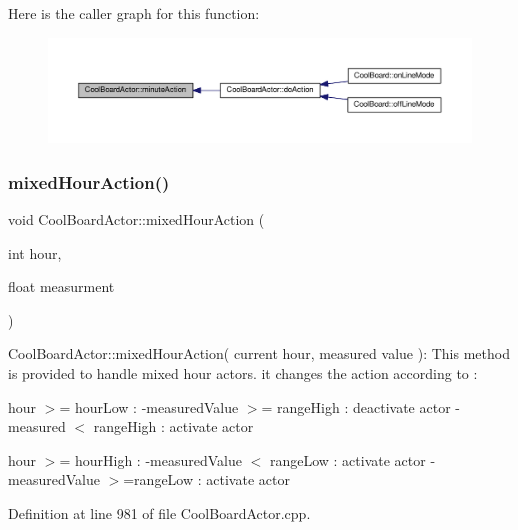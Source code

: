 Here is the caller graph for this function\+:
\nopagebreak
\begin{figure}[H]
\begin{center}
\leavevmode
\includegraphics[width=350pt]{dc/d69/class_cool_board_actor_af000944ce0b9abb9c6ee4b8fe839fb36_icgraph}
\end{center}
\end{figure}
\mbox{\label{class_cool_board_actor_a6d93a24502c56ced2ef7675c913a276b}} 
\subsubsection{\texorpdfstring{mixed\+Hour\+Action()}{mixedHourAction()}}
{\footnotesize\ttfamily void Cool\+Board\+Actor\+::mixed\+Hour\+Action (\begin{DoxyParamCaption}\item[{int}]{hour,  }\item[{float}]{measurment }\end{DoxyParamCaption})}

Cool\+Board\+Actor\+::mixed\+Hour\+Action( current hour, measured value )\+: This method is provided to handle mixed hour actors. it changes the action according to \+:

hour $>$= hour\+Low \+: -\/measured\+Value $>$= range\+High \+: deactivate actor -\/measured $<$ range\+High \+: activate actor

hour $>$= hour\+High \+: -\/measured\+Value $<$ range\+Low \+: activate actor -\/measured\+Value $>$=range\+Low \+: activate actor 

Definition at line 981 of file Cool\+Board\+Actor.\+cpp.


